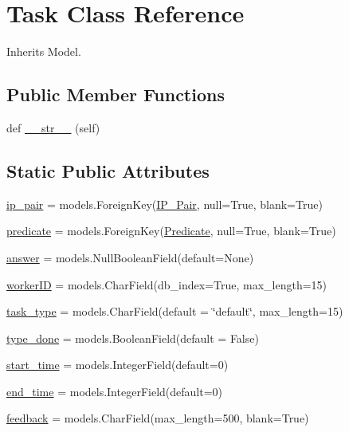 \hypertarget{classdynamicfilterapp_1_1models_1_1_task}{}\section{Task Class Reference}
\label{classdynamicfilterapp_1_1models_1_1_task}


Inherits Model.

\subsection*{Public Member Functions}
\begin{DoxyCompactItemize}
\item 
def \mbox{\hyperlink{classdynamicfilterapp_1_1models_1_1_task_a23e8041ce1015febe4fdace3225714f9}{\+\_\+\+\_\+str\+\_\+\+\_\+}} (self)
\end{DoxyCompactItemize}
\subsection*{Static Public Attributes}
\begin{DoxyCompactItemize}
\item 
\mbox{\hyperlink{classdynamicfilterapp_1_1models_1_1_task_a6a81c84f60e4fc0f40d6812d6f6452c7}{ip\+\_\+pair}} = models.\+Foreign\+Key(\mbox{\hyperlink{classdynamicfilterapp_1_1models_1_1_i_p___pair}{I\+P\+\_\+\+Pair}}, null=True, blank=True)
\item 
\mbox{\hyperlink{classdynamicfilterapp_1_1models_1_1_task_a59edc4e3874fffd0c2a9ef88cddfc0fa}{predicate}} = models.\+Foreign\+Key(\mbox{\hyperlink{classdynamicfilterapp_1_1models_1_1_predicate}{Predicate}}, null=True, blank=True)
\item 
\mbox{\hyperlink{classdynamicfilterapp_1_1models_1_1_task_a8c4d9ee8d4f82d724070b97e70b9c4e5}{answer}} = models.\+Null\+Boolean\+Field(default=None)
\item 
\mbox{\hyperlink{classdynamicfilterapp_1_1models_1_1_task_ab569d6674e112f916cbe81a2304d418f}{worker\+ID}} = models.\+Char\+Field(db\+\_\+index=True, max\+\_\+length=15)
\item 
\mbox{\hyperlink{classdynamicfilterapp_1_1models_1_1_task_ab8d9e3d1f9fdf95a31d7b4ce32768eab}{task\+\_\+type}} = models.\+Char\+Field(default = \char`\"{}default\char`\"{}, max\+\_\+length=15)
\item 
\mbox{\hyperlink{classdynamicfilterapp_1_1models_1_1_task_a47b4d7e0fa28b08ed57f086799b026d2}{type\+\_\+done}} = models.\+Boolean\+Field(default = False)
\item 
\mbox{\hyperlink{classdynamicfilterapp_1_1models_1_1_task_a2530c3908f0179486a4c2255f792e27a}{start\+\_\+time}} = models.\+Integer\+Field(default=0)
\item 
\mbox{\hyperlink{classdynamicfilterapp_1_1models_1_1_task_aa18736cc12f8beb112bd108c5a09ef8d}{end\+\_\+time}} = models.\+Integer\+Field(default=0)
\item 
\mbox{\hyperlink{classdynamicfilterapp_1_1models_1_1_task_aecc50b4643d1ea45de7afe20e729c160}{feedback}} = models.\+Char\+Field(max\+\_\+length=500, blank=True)
\end{DoxyCompactItemize}


